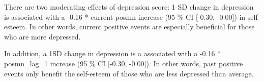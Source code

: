 \documentclass[]{article}
\newenvironment{Shaded}{\begin{snugshade}}{\end{snugshade}}
\newcommand{\KeywordTok}[1]{\textcolor[rgb]{0.13,0.29,0.53}{\textbf{#1}}}
\newcommand{\DataTypeTok}[1]{\textcolor[rgb]{0.13,0.29,0.53}{#1}}
\newcommand{\DecValTok}[1]{\textcolor[rgb]{0.00,0.00,0.81}{#1}}
\newcommand{\StringTok}[1]{\textcolor[rgb]{0.31,0.60,0.02}{#1}}
\newcommand{\OtherTok}[1]{\textcolor[rgb]{0.56,0.35,0.01}{#1}}
\newcommand{\OperatorTok}[1]{\textcolor[rgb]{0.81,0.36,0.00}{\textbf{#1}}}
\newcommand{\NormalTok}[1]{#1}
\begin{document}
There are two moderating effects of depression score: 1 SD change in
depression is associated with a -0.16 * current posmn increase (95 \% CI
{[}-0.30, -0.00{]}) in self-esteem. In other words, current positive
events are especially beneficial for those who are more depressed.

In addition, a 1SD change in depression is a associated with a -0.16 *
posmn\_lag\_1 increase (95 \% CI {[}-0.30, -0.00{]}). In other words,
past positive events only benefit the self-esteem of those who are less
depressed than average.

\begin{Shaded}
\end{Shaded}
\end{document}
